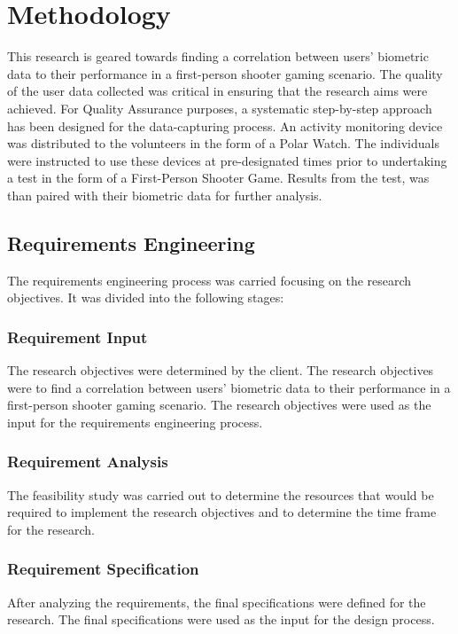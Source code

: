 \chapter{Methodology}

This research is geared towards finding a correlation between users' biometric data to their performance in a first-person shooter gaming scenario. The quality of the user data 
collected was critical in ensuring that the research aims were achieved. For Quality Assurance purposes, a systematic step-by-step approach has been designed for the data-capturing 
process. An activity monitoring device was distributed to the volunteers in the form of a Polar Watch. The individuals were instructed to use these devices at pre-designated times 
prior to undertaking a test in the form of a First-Person Shooter Game. Results from the test, was than paired with their biometric data for further analysis.

\section{Requirements Engineering}
The requirements engineering process was carried focusing on the research objectives. It was divided into the following stages:

\subsection{Requirement Input}
The research objectives were determined by the client. The research objectives were to find a correlation between users' biometric data to their performance in a
first-person shooter gaming scenario. The research objectives were used as the input for the requirements engineering process.

\subsection{Requirement Analysis}
The feasibility study was carried out to determine the resources that would be required to implement the research objectives and to determine the time frame for the research. 

\subsection{Requirement Specification}
After analyzing the requirements, the final specifications were defined for the research. The final specifications were used as the input for the design process.

